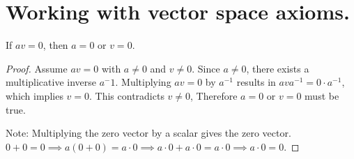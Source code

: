 \section{Working with vector space axioms.}
If $av = 0$, then $a=0$ or $v=0$.
\begin{proof}
    Assume $av = 0$ with $a \neq 0$ and $v \neq 0$.
    Since $a \neq 0$, there exists a multiplicative inverse $a^-1$.
    Multiplying $av = 0$ by $a^{-1}$ results in $ava^{-1} = 0 \cdot a^{-1}$,
    which implies $v = 0$. This contradicts $v \neq 0$,
    Therefore $a=0$ or $v=0$ must be true.\gap
    
    Note: Multiplying the zero vector by a scalar gives the zero vector.
    $0 + 0 = 0 \implies 
    a(0 + 0) = a \cdot 0 \implies 
    a \cdot 0 + a\cdot 0 = a \cdot 0 \implies
    a \cdot 0 = 0$.

\end{proof}